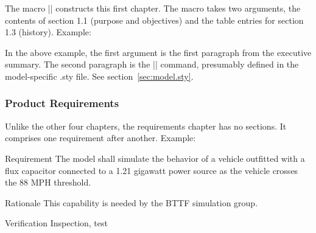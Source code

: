 The macro |\boilerplatechapterone| constructs this first chapter.
The macro takes two arguments, the contents of section 1.1 (purpose and objectives) and the table entries for section 1.3 (history). Example:

\begin{codeblock}
{
  \ModelHistory
}
\end{codeblock}

In the above example, the first argument is the first paragraph from the
executive summary. The second paragraph is the |\ModelHistory| command,
presumably defined in the model-specific .sty file.
See section~\ref{sec:model.sty}.


\subsubsection{Product Requirements}
\label{sec:chaptertwo}
Unlike the other four chapters, the requirements chapter has no sections.
It comprises one requirement after another.
Example:
\begin{codeblock}
\label{reqt:1.21gigawatts}
\begin{description:}
\item[Requirement]
 The model shall simulate the behavior of a vehicle outfitted with a
 flux capacitor connected to a 1.21 gigawatt power source
 as the vehicle crosses the 88 MPH threshold.
\item[Rationale]
This capability is needed by the BTTF simulation group.
\item[Verification]
Inspection, test
\end{description:}
\end{codeblock}

